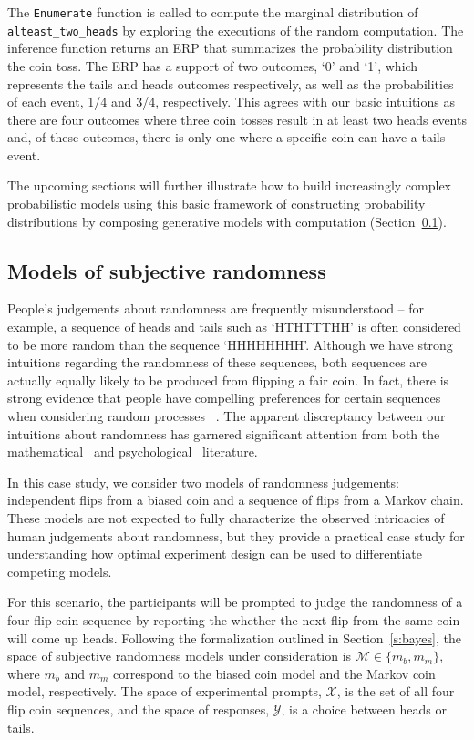 \documentclass[11pt]{article}
\begin{document}
The \texttt{Enumerate} function is called to compute the marginal distribution of \texttt{alteast\_two\_heads} by exploring the executions of the random computation. The inference function returns an ERP that summarizes the probability distribution the coin toss. The ERP has a support of two outcomes, `0' and `1', which represents the tails and heads outcomes respectively, as well as the probabilities of each event, 1/4 and 3/4, respectively. This agrees with our basic intuitions as there are four outcomes where three coin tosses result in at least two heads events and, of these outcomes, there is only one where a specific coin can have a tails event.

The upcoming sections will further illustrate how to build increasingly complex probabilistic models using this basic framework of constructing probability distributions by composing generative models with computation (Section~\ref{s:tutorial:ss:randomness}).

\subsection{Models of subjective randomness}
\label{s:tutorial:ss:randomness}
People's judgements about randomness are frequently misunderstood -- for example, a sequence of heads and tails such as `HTHTTTHH' is often considered to be more random than the sequence `HHHHHHHH'. Although we have strong intuitions regarding the randomness of these sequences, both sequences are actually equally likely to be produced from flipping a fair coin. In fact, there is strong evidence that people have compelling preferences for certain sequences when considering random processes ~\cite{goodfellow38:jep}. The apparent discreptancy between our intuitions about randomness has garnered significant attention from both the mathematical~\cite{chaitin01:er, kac83:as, li97:kca} and psychological~\cite{falk81:pme, lopes82:jep, griffiths01:cogsci} literature. 

In this case study, we consider two models of randomness judgements: independent flips from a biased coin and a sequence of flips from a Markov chain. These models are not expected to fully characterize the observed intricacies of human judgements about randomness, but they provide a practical case study for understanding how optimal experiment design can be used to differentiate competing models. 

For this scenario, the participants will be prompted to judge the randomness of a four flip coin sequence by reporting the whether the next flip from the same coin will come up heads. Following the formalization outlined in Section~\ref{s:bayes}, the space of subjective randomness models under consideration is $\mathcal{M} \in \{m_b, m_m\}$, where $m_b$ and $m_m$ correspond to the biased coin model and the Markov coin model, respectively. The space of experimental prompts, $\mathcal{X}$, is the set of all four flip coin sequences, and the space of responses, $\mathcal{Y}$, is a choice between heads or tails.
\end{document}
